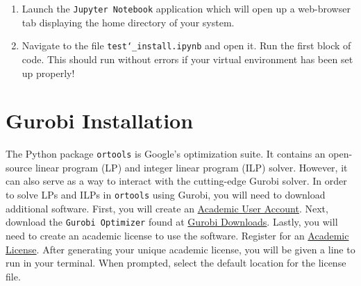 \documentclass[11 pt]{article}
\begin{document}
\begin{enumerate}
\item Launch the \texttt{Jupyter Notebook} application which will open up a web-browser tab displaying the home directory of your system. 

\item Navigate to the file \texttt{test\char`_install.ipynb} and open it. Run the first block of code. This should run without errors if your virtual environment has been set up properly!

\end{enumerate}

\section{Gurobi Installation}

The Python package \texttt{ortools} is Google's optimization suite. It contains an open-source linear program (LP) and integer linear program (ILP) solver. However, it can also serve as a way to interact with the cutting-edge Gurobi solver. In order to solve LPs and ILPs in \texttt{ortools} using Gurobi, you will need to download additional software. First, you will create an \href{https://pages.gurobi.com/registration}{Academic User Account}. Next, download the \texttt{Gurobi Optimizer} found at \href{https://www.gurobi.com/downloads/}{Gurobi Downloads}. Lastly, you will need to create an academic license to use the software. Register for an \href{https://www.gurobi.com/downloads/end-user-license-agreement-academic/}{Academic License}. After generating your unique academic license, you will be given a line to run in your terminal. When prompted, select the default location for the license file.


\begin{center}
\end{center}
\begin{center}
\end{center}
\end{document}
